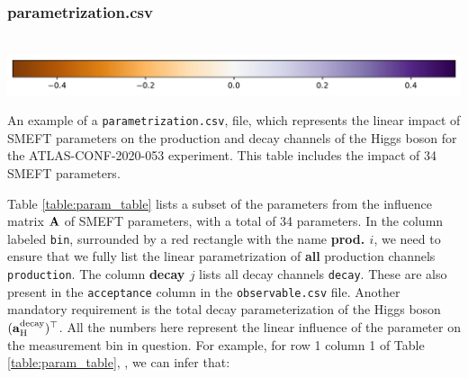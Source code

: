 \documentclass[12pt]{article}
\newlength{\mywidth}\setlength{\mywidth}{14.5cm}
\def\b#1{\boldsymbol{\rm #1}}
\begin{document}
 \subsubsection{parametrization.csv}
 \begin{table}
   \resizebox{\textwidth}{!}{
     
     }\\
     \includegraphics{colorbar_param_example.pdf}\\
     \caption{An example of a \texttt{parametrization.csv}, file, which represents the linear impact of SMEFT parameters on the production and decay channels of the Higgs boson for the ATLAS-CONF-2020-053 \cite{ATLAS:2020naq} experiment. This table includes the impact of 34 SMEFT parameters. \label{table:param_table}}
 \end{table}
 Table \ref{table:param_table} lists a subset of the parameters from the influence matrix $\b A$ of SMEFT parameters, with a total of 34 parameters. In the column labeled \verb|bin|, surrounded by a red rectangle with the name {\color{red}\textbf{prod. $i$}}, we need to ensure that we fully list the linear parametrization of \textbf{all} production channels \verb|production|. The column {\color{red}\textbf{decay $j$}} lists all decay channels \verb|decay|. These are also present in the \verb|acceptance| column in the \verb|observable.csv| file. Another mandatory requirement is the total decay parameterization of the Higgs boson $(\b{a}_{\rm H}^{\rm decay})^\top$. All the numbers here represent the linear influence of the parameter on the measurement bin in question. For example, for row 1 column 1 of Table \ref{table:param_table}, , we can infer that:
\end{document}
